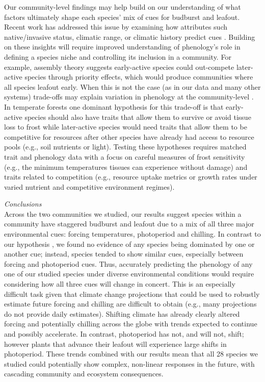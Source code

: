 \documentclass[11pt]{article}
\begin{document}
Our community-level findings may help build on our understanding of what factors ultimately shape each species' mix of cues for budburst and leafout. Recent work has addressed this issue by examining how attributes such native/invasive status, climatic range, or climatic history predict cues \citep[e.g.,][]{Laube2015,zohner2017}. Building on these insights will require improved understanding of phenology's role in defining a species niche and controlling its inclusion in a community. For example, assembly theory suggests early-active species could out-compete later-active species through priority effects, which would produce communities where all species leafout early. When this is not the case (as in our data and many other systems) trade-offs may explain variation in phenology at the community-level \citep{Chesson:1997dz}. In temperate forests one dominant hypothesis for this trade-off is that early-active species should also have traits that allow them to survive or avoid tissue loss to frost \citep{Sakai:1987aa} while later-active species would need traits that allow them to be competitive for resources after other species have already had access to resource pools (e.g., soil nutrients or light). Testing these hypotheses requires matched trait and phenology data with a focus on careful measures of frost sensitivity (e.g., the minimum temperatures tissues can experience without damage) and traits related to competition (e.g., resource uptake metrics or growth rates under varied nutrient and competitive environment regimes).

\noindent \emph{Conclusions}\\
Across the two communities we studied, our results suggest species within a community have staggered budburst and leafout due to a mix of all three major environmental cues: forcing temperatures, photoperiod and chilling. In contrast to our hypothesis \citep[and others', e.g.,][]{Korner:2010}, we found no evidence of any species being dominated by one or another cue; instead, species tended to show similar cues, especially between forcing and photoperiod cues.  Thus, accurately predicting the phenology of any one of our studied species under diverse environmental conditions would require considering how all three cues will change in concert. This is an especially difficult task given that climate change projections that could be used to robustly estimate future forcing and chilling are difficult to obtain (e.g., many projections do not provide daily estimates). Shifting climate has already clearly altered forcing and potentially chilling across the globe \citep{ipcc2013,IPCC:2014sm} with trends expected to continue and possibly accelerate. In contrast, photoperiod has not, and will not, shift; however plants that advance their leafout will experience large shifts in photoperiod. These trends combined with our results mean that all 28 species we studied could potentially show complex, non-linear responses in the future, with cascading community and ecosystem consequences. %
\end{document}
